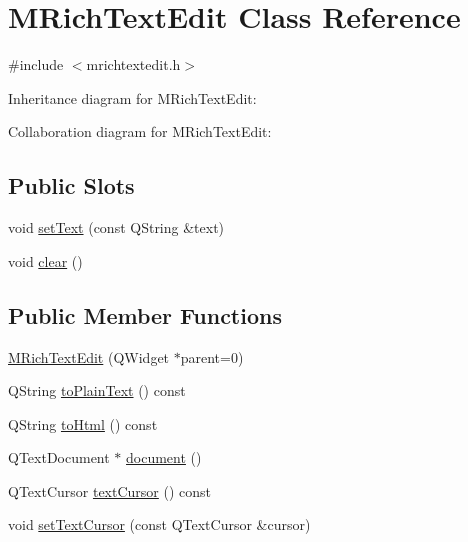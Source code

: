 \hypertarget{class_m_rich_text_edit}{}\section{M\+Rich\+Text\+Edit Class Reference}
\label{class_m_rich_text_edit}


{\ttfamily \#include $<$mrichtextedit.\+h$>$}



Inheritance diagram for M\+Rich\+Text\+Edit\+:


Collaboration diagram for M\+Rich\+Text\+Edit\+:
\subsection*{Public Slots}
\begin{DoxyCompactItemize}
\item 
void \hyperlink{class_m_rich_text_edit_a399d16bc18b366934c362ffacfb1a451}{set\+Text} (const Q\+String \&text)
\item 
void \hyperlink{class_m_rich_text_edit_a210d75555284692accb06b8dfc9820e6}{clear} ()
\end{DoxyCompactItemize}
\subsection*{Public Member Functions}
\begin{DoxyCompactItemize}
\item 
\hyperlink{class_m_rich_text_edit_a17d69881746fcd8de24674a5b862081a}{M\+Rich\+Text\+Edit} (Q\+Widget $\ast$parent=0)
\item 
Q\+String \hyperlink{class_m_rich_text_edit_a9dba18134faf345cdb5079529d1ad158}{to\+Plain\+Text} () const 
\item 
Q\+String \hyperlink{class_m_rich_text_edit_af53834cc21071819221cf47a024ce1fb}{to\+Html} () const 
\item 
Q\+Text\+Document $\ast$ \hyperlink{class_m_rich_text_edit_a93b86da18d5dd7c10ebac3aecbdd83b6}{document} ()
\item 
Q\+Text\+Cursor \hyperlink{class_m_rich_text_edit_abdede60f4b801a66ed108f880df45de3}{text\+Cursor} () const 
\item 
void \hyperlink{class_m_rich_text_edit_a6a7a2a2cc996141c4e2b61df54933ac7}{set\+Text\+Cursor} (const Q\+Text\+Cursor \&cursor)
\end{DoxyCompactItemize}
